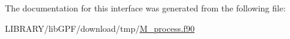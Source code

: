 The documentation for this interface was generated from the following file\+:\begin{DoxyCompactItemize}
\item 
L\+I\+B\+R\+A\+R\+Y/lib\+G\+P\+F/download/tmp/\hyperlink{M__process_8f90}{M\+\_\+process.\+f90}\end{DoxyCompactItemize}
